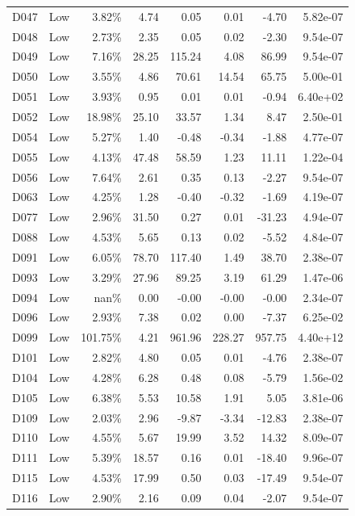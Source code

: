 \begin{tabular}{l l r r r r r r}
D047 & Low & 3.82\% & 4.74 & 0.05 & 0.01 & -4.70 & 5.82e-07 \\
D048 & Low & 2.73\% & 2.35 & 0.05 & 0.02 & -2.30 & 9.54e-07 \\
D049 & Low & 7.16\% & 28.25 & 115.24 & 4.08 & 86.99 & 9.54e-07 \\
D050 & Low & 3.55\% & 4.86 & 70.61 & 14.54 & 65.75 & 5.00e-01 \\
D051 & Low & 3.93\% & 0.95 & 0.01 & 0.01 & -0.94 & 6.40e+02 \\
D052 & Low & 18.98\% & 25.10 & 33.57 & 1.34 & 8.47 & 2.50e-01 \\
D054 & Low & 5.27\% & 1.40 & -0.48 & -0.34 & -1.88 & 4.77e-07 \\
D055 & Low & 4.13\% & 47.48 & 58.59 & 1.23 & 11.11 & 1.22e-04 \\
D056 & Low & 7.64\% & 2.61 & 0.35 & 0.13 & -2.27 & 9.54e-07 \\
D063 & Low & 4.25\% & 1.28 & -0.40 & -0.32 & -1.69 & 4.19e-07 \\
D077 & Low & 2.96\% & 31.50 & 0.27 & 0.01 & -31.23 & 4.94e-07 \\
D088 & Low & 4.53\% & 5.65 & 0.13 & 0.02 & -5.52 & 4.84e-07 \\
D091 & Low & 6.05\% & 78.70 & 117.40 & 1.49 & 38.70 & 2.38e-07 \\
D093 & Low & 3.29\% & 27.96 & 89.25 & 3.19 & 61.29 & 1.47e-06 \\
D094 & Low & nan\% & 0.00 & -0.00 & -0.00 & -0.00 & 2.34e-07 \\
D096 & Low & 2.93\% & 7.38 & 0.02 & 0.00 & -7.37 & 6.25e-02 \\
D099 & Low & 101.75\% & 4.21 & 961.96 & 228.27 & 957.75 & 4.40e+12 \\
D101 & Low & 2.82\% & 4.80 & 0.05 & 0.01 & -4.76 & 2.38e-07 \\
D104 & Low & 4.28\% & 6.28 & 0.48 & 0.08 & -5.79 & 1.56e-02 \\
D105 & Low & 6.38\% & 5.53 & 10.58 & 1.91 & 5.05 & 3.81e-06 \\
D109 & Low & 2.03\% & 2.96 & -9.87 & -3.34 & -12.83 & 2.38e-07 \\
D110 & Low & 4.55\% & 5.67 & 19.99 & 3.52 & 14.32 & 8.09e-07 \\
D111 & Low & 5.39\% & 18.57 & 0.16 & 0.01 & -18.40 & 9.96e-07 \\
D115 & Low & 4.53\% & 17.99 & 0.50 & 0.03 & -17.49 & 9.54e-07 \\
D116 & Low & 2.90\% & 2.16 & 0.09 & 0.04 & -2.07 & 9.54e-07 \\

\end{tabular}
